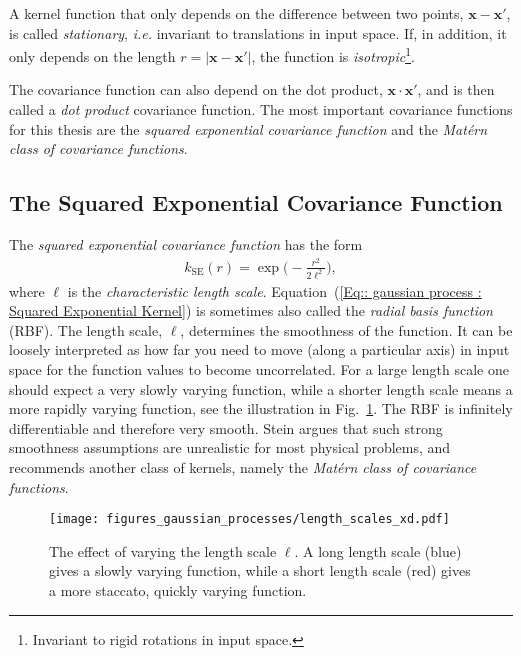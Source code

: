 \documentclass[twoside,english]{uiofysmaster}
\begin{document}
{{A kernel function that only depends on the difference between two points, $\textbf{x}-\textbf{x}'$, is called \textit{stationary}, \textit{i.e.} invariant to translations in input space. If, in addition, it only depends on the length $r=|\textbf{x}-\textbf{x}'|$, the function is \textit{isotropic}\footnote{Invariant to rigid rotations in input space.}.  

The covariance function can also depend on the dot product, $\textbf{x} \cdot \textbf{x}'$, and is then called a \textit{dot product} covariance function. The most important covariance functions for this thesis are the \textit{squared exponential covariance function} and the \textit{Mat\'{e}rn class of covariance functions}.




\subsection{The Squared Exponential Covariance Function}

The \textit{squared exponential covariance function} has the form 
\begin{align}\label{Eq:: gaussian process : Squared Exponential Kernel}
k_{\mathrm{SE}} (r) = \exp \Big( - \frac{r^2}{2 \ell^2} \Big),
\end{align} 
where $\ell$ is the \textit{characteristic length scale}. Equation~(\ref{Eq:: gaussian process : Squared Exponential Kernel}) is sometimes also called the \textit{radial basis function} (RBF). The length scale, $\ell$, determines the smoothness of the function. It can be loosely interpreted as how far you need to move (along a particular axis) in input space for the function values to become uncorrelated. For a large length scale one should expect a very slowly varying function, while a shorter length scale means a more rapidly varying function, see the illustration in Fig.~\ref{Fig:: gaussian process : ell variation example}. The RBF is infinitely differentiable and therefore very smooth. Stein \cite{steininterpolation} argues that such strong smoothness assumptions are unrealistic for most physical problems, and recommends another class of kernels, namely the \textit{Mat\'{e}rn class of covariance functions}.

\begin{figure}
\centering
\texttt{[image: figures\_gaussian\_processes/length\_scales\_xd.pdf]}
\caption{The effect of varying the length scale $\ell$. A long length scale (blue) gives a slowly varying function, while a short length scale (red) gives a more staccato, quickly varying function.}
\label{Fig:: gaussian process : ell variation example}
\end{figure}

}}
\end{document}
